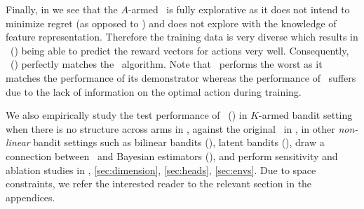 Finally, in  we see that the $A$-armed \unif\ is fully explorative as it does not intend to minimize regret (as opposed to \ts) and does not explore with the knowledge of feature representation. Therefore the training data is very diverse which results in \pred\ (\gt) being able to predict the reward vectors for actions very well. Consequently, \pred\ (\gt) perfectly matches the \linucb\ algorithm. Note that \ad\ performs the worst as it matches the performance of its demonstrator whereas the performance of \dptg\ suffers due to the lack of information on the optimal action during training.

We also empirically study the test performance of \pred\ (\gt) in $K$-armed bandit setting when there is no structure across arms in , against the original \dpt\ in , 
%
in other \textit{non-linear} bandit settings such as bilinear bandits (), latent bandits (), draw a connection between \pred\ and Bayesian estimators (), and perform sensitivity and ablation studies in , \ref{sec:dimension}, \ref{sec:heads}, \ref{sec:envs}. 
%
Due to space constraints, we refer the interested reader to the relevant section in the appendices.